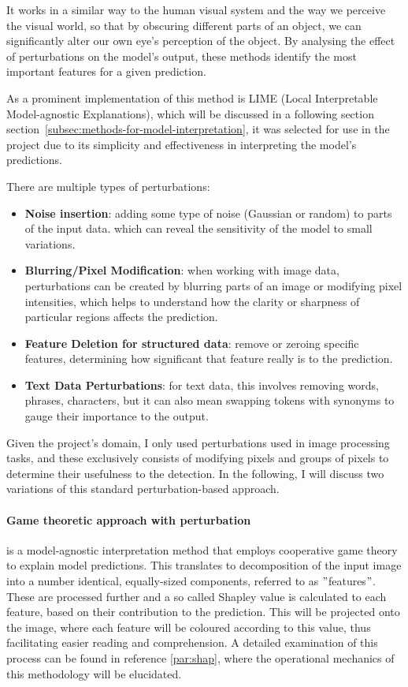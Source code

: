 It works in a similar way to the human visual system and the way we perceive the visual world,
so that by obscuring different parts of an object, we can significantly alter our own eye's perception of the object.
By analysing the effect of perturbations on the model's output, these methods identify the most important features for a given prediction.

As a prominent implementation of this method is LIME (Local Interpretable Model-agnostic Explanations), which will be discussed in a following section section~\ref{subsec:methods-for-model-interpretation}, it was selected
for use in the project due to its simplicity and effectiveness in interpreting the model's predictions.


There are multiple types of perturbations:
\begin{itemize}
    \item \textbf{Noise insertion}: adding some type of noise (Gaussian or random) to parts of the input data.
    which can reveal the sensitivity of the model to small variations.
    \item \textbf{Blurring/Pixel Modification}: when working with image data, perturbations can be created by blurring parts of an image or modifying pixel intensities, which helps to understand how the clarity or sharpness of particular regions affects the prediction.
    \item \textbf{Feature Deletion for structured data}: remove or zeroing specific features, determining how significant that feature really is to the prediction.
    \item \textbf{Text Data Perturbations}: for text data, this involves removing words, phrases, characters, but it can also mean swapping tokens with synonyms to gauge their importance to the output.
\end{itemize}

Given the project's domain, I only used perturbations used in image processing tasks, and these exclusively consists of modifying pixels and groups of pixels to determine their usefulness to the detection.
In the following, I will discuss two variations of this standard perturbation-based approach.

\paragraph{Game theoretic approach with perturbation}\label{par:game-theoretic-approach-with-pertubation}

 is a model-agnostic interpretation method that employs cooperative game theory to explain model predictions.
This translates to decomposition of the input image into a number identical, equally-sized components, referred to as \("\)features\("\).
These are processed further and a so called Shapley value is calculated to each feature, based on their contribution to the prediction.
This will be projected onto the image, where each feature will be coloured according to this value, thus facilitating easier reading and comprehension.
A detailed examination of this process can be found in reference \ref{par:shap}, where the operational mechanics of this methodology will be elucidated.


